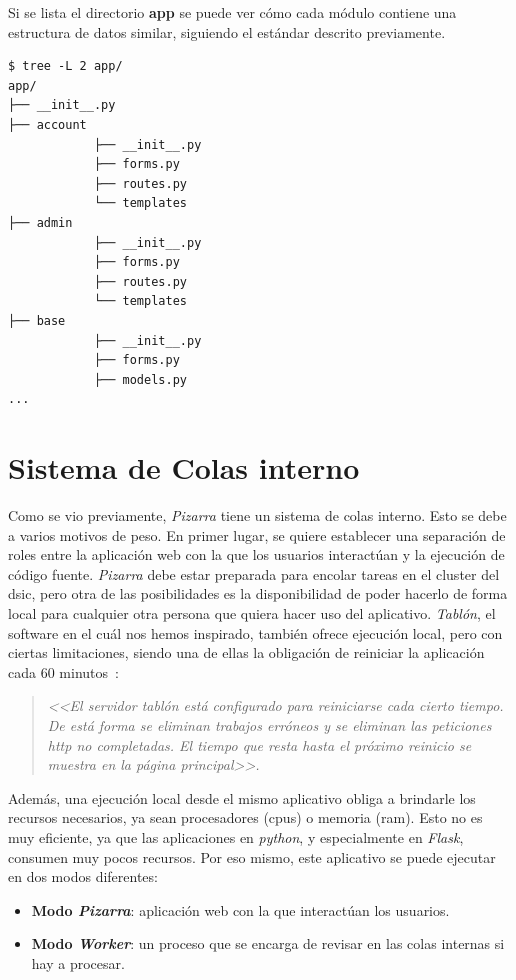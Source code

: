 \documentclass[11pt,spanish,listoffigures,listoftables]{tfgetsinf}
\begin{document}
Si se lista el directorio \textbf{app} se puede ver cómo cada módulo contiene una estructura de datos similar, siguiendo el estándar descrito previamente.

\begin{lstlisting}[style=ascii-tree]
$ tree -L 2 app/
app/
├── __init__.py
├── account
			├── __init__.py
			├── forms.py
			├── routes.py
			└── templates
├── admin
			├── __init__.py
			├── forms.py
			├── routes.py
			└── templates
├── base
			├── __init__.py
			├── forms.py
			├── models.py
...
\end{lstlisting}

\section{Sistema de Colas  interno}

Como se vio previamente, \textit{Pizarra} tiene un sistema de \Gls{cola}s interno. Esto se debe a varios motivos de peso. En primer lugar, se quiere establecer una separación de roles entre la aplicación web con la que los usuarios interactúan y la ejecución de código fuente. \textit{Pizarra} debe estar preparada para encolar tareas en el cluster \kahan del \acrshort{dsic}, pero otra de las posibilidades es la disponibilidad de poder hacerlo de forma local para cualquier otra persona que quiera hacer uso del aplicativo. \textit{Tablón}, el software en el cuál nos hemos inspirado, también ofrece ejecución local, pero con ciertas limitaciones, siendo una de ellas la obligación de reiniciar la aplicación cada 60 minutos~\cite{link-tablon-faq}:

\begin{quote}
    \textit{
    <<El servidor tablón está configurado para reiniciarse cada cierto tiempo. De está forma se eliminan trabajos erróneos y se eliminan las peticiones http no completadas. El tiempo que resta hasta el próximo reinicio se muestra en la página principal>>.}
\end{quote}

Además, una ejecución local desde el mismo aplicativo obliga a brindarle los recursos necesarios, ya sean procesadores (\acrshort{cpu}s) o memoria (\acrshort{ram}). Esto no es muy eficiente, ya que las aplicaciones en \textit{python}, y especialmente en \textit{Flask}, consumen muy pocos recursos. Por eso mismo, este aplicativo se puede ejecutar en dos modos diferentes:
\begin{itemize}
	\item \textbf{Modo \textit{Pizarra}}: aplicación web con la que interactúan los usuarios.
	\item \textbf{Modo \textit{Worker}}: un proceso que se encarga de revisar en las \gls{cola}s internas si hay  a procesar.
\end{itemize}
\end{document}
